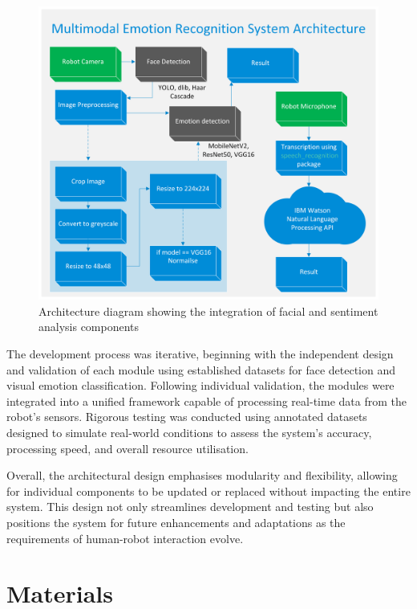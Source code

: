 \begin{figure}[!htb]
    \centering{}
    \includegraphics[scale=0.35]{m+m_images/ArchitectureDiagram.png}
    \caption{Architecture diagram showing the integration of facial and sentiment analysis components}
    \label{figure:architecturediagram}
\end{figure}

The development process was iterative, beginning with the independent design and validation of each module using established datasets for face detection and visual emotion classification. Following individual validation, the modules were integrated into a unified framework capable of processing real-time data from the robot's sensors. Rigorous testing was conducted using annotated datasets designed to simulate real-world conditions to assess the system's accuracy, processing speed, and overall resource utilisation.

Overall, the architectural design emphasises modularity and flexibility, allowing for individual components to be updated or replaced without impacting the entire system. This design not only streamlines development and testing but also positions the system for future enhancements and adaptations as the requirements of human-robot interaction evolve.

\section{Materials}

